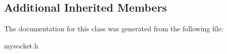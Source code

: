 \subsection*{Additional Inherited Members}


The documentation for this class was generated from the following file\+:\begin{DoxyCompactItemize}
\item 
mysocket.\+h\end{DoxyCompactItemize}
